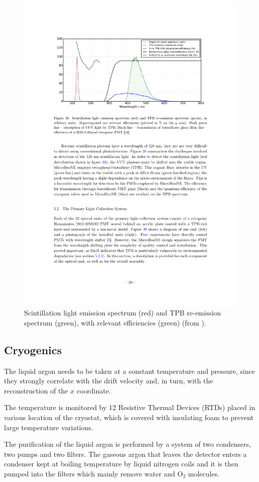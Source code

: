 \begin{figure}[htbp]
    \centering
    \includegraphics[width=0.85\linewidth]{figures/light.pdf}
    \caption{Scintillation light emission spectrum (red) and TPB re-emission spectrum (green),  with relevant efficiencies (green) (from \cite{Acciarri:2016sli}).}
    \label{fig:light}
\end{figure}

\subsection{Cryogenics}
The liquid argon needs to be taken at a constant temperature and pressure, since they strongly correlate with the drift velocity and, in turn, with the reconstruction of the $x$ coordinate.

The temperature is monitored by 12 Resistive Thermal Devices (RTDs) placed in various location of the cryostat, which is covered with insulating foam to prevent large temperature variations. 

The purification of the liquid argon is performed by a system of two condensers, two pumps and two filters. The gaseous argon that leaves the detector enters a condenser kept at boiling temperature by liquid nitrogen coils and it is then pumped into the filters which mainly remove water and O$_2$ molecules. 

